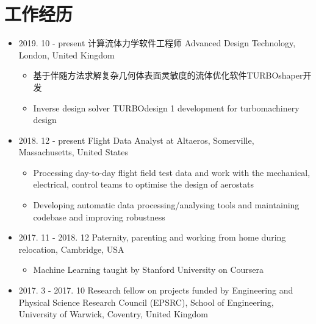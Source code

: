 \documentclass[letterpaper]{article}
\begin{document}
\vspace{-12pt}
\section*{工作经历}
\vspace{-10pt}
\begin{itemize}
\item  2019. 10 - present 计算流体力学软件工程师 Advanced Design Technology, London, United Kingdom 
\begin{itemize}
\item 基于伴随方法求解复杂几何体表面灵敏度的流体优化软件TURBOshaper开发
\item Inverse design solver TURBOdesign 1 development for turbomachinery design
\end{itemize} 
\item 2018. 12 - present \hspace{2pt} Flight Data Analyst at Altaeros, Somerville, Massachusetts, United States
	\begin{itemize}
	\item Processing day-to-day flight field test data and work with the mechanical, electrical, control teams to optimise the design of aerostats 
	\item Developing automatic data processing/analysing tools and maintaining codebase and improving robustness
	\end{itemize}
\item 2017. 11 - 2018. 12 \hspace{2pt} Paternity, parenting and working from home during relocation, Cambridge, USA
		\begin{itemize}
		\item Machine Learning taught by Stanford University on Coursera
		\end{itemize}		
\item 2017. 3 - 2017. 10  \hspace{2pt} Research fellow on projects funded by Engineering and Physical Science Research Council (EPSRC), School of Engineering, University of Warwick, Coventry, United Kingdom

\end{itemize}
\end{document}
